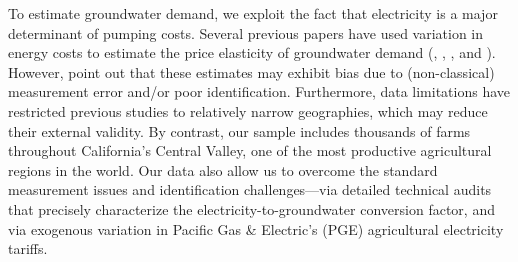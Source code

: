 To estimate groundwater demand, we exploit the fact that electricity is a major determinant of pumping costs. Several previous papers have used variation in energy costs to estimate the price elasticity of groundwater demand (\textcite{hendricks2012}, \textcite{pfeiffer2014}, \textcite{badiani2015}, and \textcite{mieno2017}). However, \textcite{mieno2017} point out that these estimates may exhibit bias due to (non-classical) measurement error and/or poor identification. Furthermore, data limitations have restricted previous studies to relatively narrow geographies, which may reduce their external validity.
By contrast, our sample includes thousands of farms throughout California's Central Valley, one of the most productive agricultural regions in the world. Our data also allow us to overcome the standard measurement issues and identification challenges---via detailed technical audits that precisely characterize the electricity-to-groundwater conversion factor, and via exogenous variation in Pacific Gas \& Electric's (PGE) agricultural electricity tariffs.


\begin{comment}

\begin{itemize}

\item APEP pump tests are the other piece of this puzzle, and we can observe pump-specific conversion rates.

\end{itemize}
	
\end{comment}

